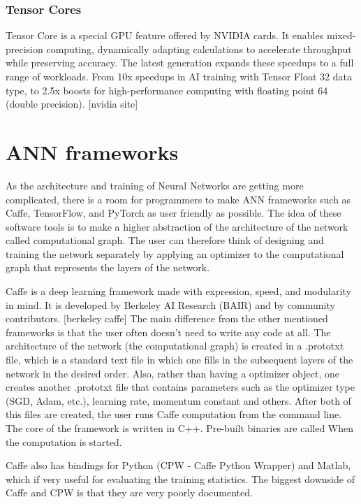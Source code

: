 \subsubsection{Tensor Cores}

Tensor Core is a special GPU feature offered by NVIDIA cards. It enables mixed-precision computing, dynamically adapting calculations to accelerate throughput while preserving accuracy. The latest generation expands these speedups to a full range of workloads. From 10x speedups in AI training with Tensor Float 32 data type, to 2.5x boosts for high-performance computing with floating point 64 (double precision). [nvidia site]

\section{ANN frameworks}

As the architecture and training of Neural Networks are getting more complicated, there is a room for programmers to make ANN frameworks such as Caffe, TensorFlow, and PyTorch as user friendly as possible. The idea of these software tools is to make a higher abstraction of the architecture of the network called computational graph. The user can therefore think of designing and training the network separately by applying an optimizer to the computational graph that represents the layers of the network. 

Caffe is a deep learning framework made with expression, speed, and modularity in mind. It is developed by Berkeley AI Research (BAIR) and by community contributors. [berkeley caffe] The main difference from the other mentioned frameworks is that the user often doesn't need to write any code at all. The architecture of the network (the computational graph) is created in a .prototxt file, which is a standard text file in which one fills in the subsequent layers of the network in the desired order. Also, rather than having a optimizer object, one creates another .prototxt file that contains parameters such as the optimizer type (SGD, Adam, etc.), learning rate, momentum constant and others. After both of this files are created, the user runs Caffe computation from the command line. The core of the framework is written in C++. Pre-built binaries are called When the computation is started.

Caffe also has bindings for Python (CPW - Caffe Python Wrapper) and Matlab, which if very useful for evaluating the training statistics. The biggest downside of Caffe and CPW is that they are very poorly documented.

